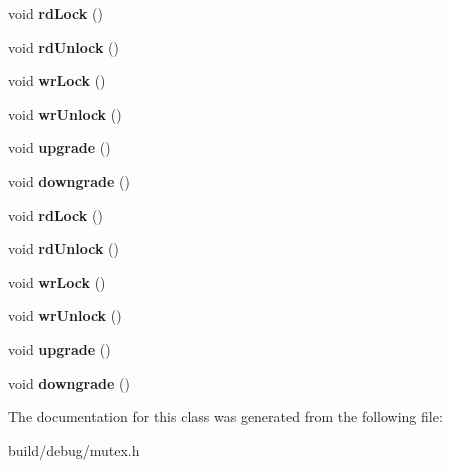 \begin{DoxyCompactItemize}
\item 
\hypertarget{classrwmutex_aae015288d224f5bf12d202d92d0d93be}{void {\bfseries rd\-Lock} ()}\label{classrwmutex_aae015288d224f5bf12d202d92d0d93be}

\item 
\hypertarget{classrwmutex_af204a472049ed5247aa1ce9603a65dc9}{void {\bfseries rd\-Unlock} ()}\label{classrwmutex_af204a472049ed5247aa1ce9603a65dc9}

\item 
\hypertarget{classrwmutex_aff34df7af0f8f543bc1f3e27283b929b}{void {\bfseries wr\-Lock} ()}\label{classrwmutex_aff34df7af0f8f543bc1f3e27283b929b}

\item 
\hypertarget{classrwmutex_a7d2d2fa1767b90c47d42b39e93259a8d}{void {\bfseries wr\-Unlock} ()}\label{classrwmutex_a7d2d2fa1767b90c47d42b39e93259a8d}

\item 
\hypertarget{classrwmutex_a24880f8e002600d083fa8fc6d4a0a2b7}{void {\bfseries upgrade} ()}\label{classrwmutex_a24880f8e002600d083fa8fc6d4a0a2b7}

\item 
\hypertarget{classrwmutex_a3bfb46e5e15444e239dc3936f1461205}{void {\bfseries downgrade} ()}\label{classrwmutex_a3bfb46e5e15444e239dc3936f1461205}

\item 
\hypertarget{classrwmutex_aae015288d224f5bf12d202d92d0d93be}{void {\bfseries rd\-Lock} ()}\label{classrwmutex_aae015288d224f5bf12d202d92d0d93be}

\item 
\hypertarget{classrwmutex_af204a472049ed5247aa1ce9603a65dc9}{void {\bfseries rd\-Unlock} ()}\label{classrwmutex_af204a472049ed5247aa1ce9603a65dc9}

\item 
\hypertarget{classrwmutex_aff34df7af0f8f543bc1f3e27283b929b}{void {\bfseries wr\-Lock} ()}\label{classrwmutex_aff34df7af0f8f543bc1f3e27283b929b}

\item 
\hypertarget{classrwmutex_a7d2d2fa1767b90c47d42b39e93259a8d}{void {\bfseries wr\-Unlock} ()}\label{classrwmutex_a7d2d2fa1767b90c47d42b39e93259a8d}

\item 
\hypertarget{classrwmutex_a24880f8e002600d083fa8fc6d4a0a2b7}{void {\bfseries upgrade} ()}\label{classrwmutex_a24880f8e002600d083fa8fc6d4a0a2b7}

\item 
\hypertarget{classrwmutex_a3bfb46e5e15444e239dc3936f1461205}{void {\bfseries downgrade} ()}\label{classrwmutex_a3bfb46e5e15444e239dc3936f1461205}

\end{DoxyCompactItemize}


The documentation for this class was generated from the following file\-:\begin{DoxyCompactItemize}
\item 
build/debug/mutex.\-h\end{DoxyCompactItemize}
